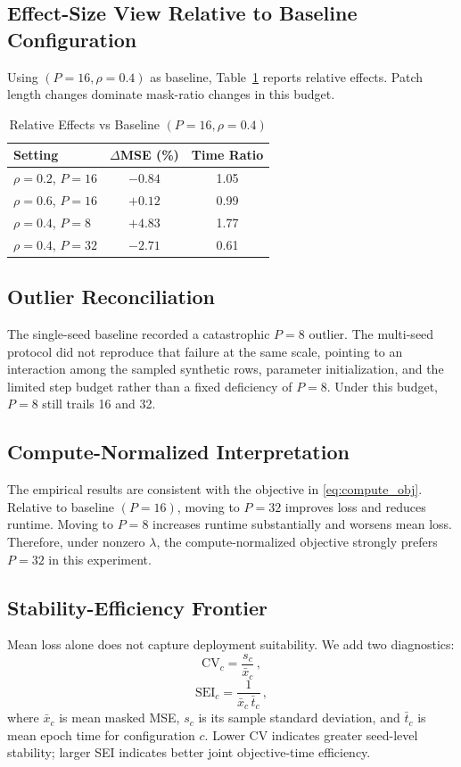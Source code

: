 \documentclass[journal]{IEEEtran}
\begin{document}
\subsection{Effect-Size View Relative to Baseline Configuration}
Using $(P=16,\rho=0.4)$ as baseline, Table~\ref{tab:effects} reports relative effects. Patch length changes dominate mask-ratio changes in this budget.

\begin{table}[t]
\caption{Relative Effects vs Baseline $(P=16,\rho=0.4)$}
\label{tab:effects}
\centering
\begin{tabular}{lcc}
\toprule
Setting & $\Delta$MSE (\%) & Time Ratio \\
\midrule
$\rho=0.2$, $P=16$ & $-0.84$ & 1.05 \\
$\rho=0.6$, $P=16$ & $+0.12$ & 0.99 \\
$\rho=0.4$, $P=8$  & $+4.83$ & 1.77 \\
$\rho=0.4$, $P=32$ & $-2.71$ & 0.61 \\
\bottomrule
\end{tabular}
\end{table}

\subsection{Outlier Reconciliation}
The single-seed baseline recorded a catastrophic $P=8$ outlier. The multi-seed protocol did not reproduce that failure at the same scale, pointing to an interaction among the sampled synthetic rows, parameter initialization, and the limited step budget rather than a fixed deficiency of $P=8$. Under this budget, $P=8$ still trails 16 and 32.

\subsection{Compute-Normalized Interpretation}
The empirical results are consistent with the objective in \eqref{eq:compute_obj}. Relative to baseline $(P=16)$, moving to $P=32$ improves loss and reduces runtime. Moving to $P=8$ increases runtime substantially and worsens mean loss. Therefore, under nonzero $\lambda$, the compute-normalized objective strongly prefers $P=32$ in this experiment.

\subsection{Stability-Efficiency Frontier}
Mean loss alone does not capture deployment suitability. We add two diagnostics:
\begin{equation}
\mathrm{CV}_c = \frac{s_c}{\bar{x}_c}\,,
\label{eq:cv_metric}
\end{equation}
\begin{equation}
\mathrm{SEI}_c = \frac{1}{\bar{x}_c\,\bar{t}_c}\,,
\label{eq:sei_metric}
\end{equation}
where $\bar{x}_c$ is mean masked MSE, $s_c$ is its sample standard deviation, and $\bar{t}_c$ is mean epoch time for configuration $c$. Lower CV indicates greater seed-level stability; larger SEI indicates better joint objective-time efficiency.
\end{document}
